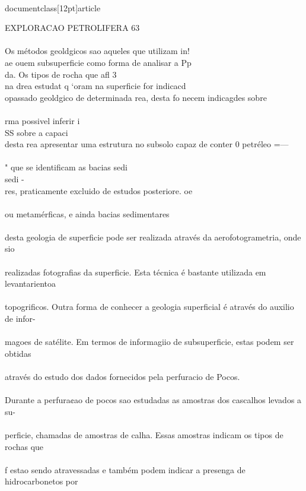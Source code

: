 \\documentclass[12pt]{article}
\begin{document}
{EXPLORACAO PETROLIFERA 63\\
\\
Os métodos geoldgicos sao aqueles que utilizam in!\\
ae ouem subsuperficie como forma de analisar a Pp\\
da. Os tipos de rocha que afl 3\\
na drea estudat q ‘oram na superficie for indicacd\\
opassado geoldgico de determinada rea, desta fo necem indicagdes sobre\\
\\
rma  possivel inferir i\\
SS sobre a capaci\\
desta rea apresentar uma estrutura no subsolo capaz de conter 0 petréleo =—\\
\\
" que se identificam as bacias sedi\\
sedi -\\
res, praticamente excluido de estudos posteriore. oe\\
\\
ou metamérficas, e ainda bacias sedimentares\\
\\
desta geologia de superficie pode ser realizada através da aerofotogrametria, onde sio\\
\\
realizadas fotografias da superficie. Esta técnica é bastante utilizada em levantarientoa\\
\\
topogrificos. Outra forma de conhecer a geologia superficial é através do auxilio de infor-\\
\\
magoes de satélite. Em termos de informagiio de subsuperficie, estas podem ser obtidas\\
\\
através do estudo dos dados fornecidos pela perfuracio de Pocos.\\
\\
Durante a perfura¢ao de pocos sao estudadas as amostras dos cascalhos levados a su-\\
\\
perficie, chamadas de amostras de calha. Essas amostras indicam os tipos de rochas que\\
\\
f estao sendo atravessadas e também podem indicar a presenga de hidrocarbonetos por\\
}
\end{document}
